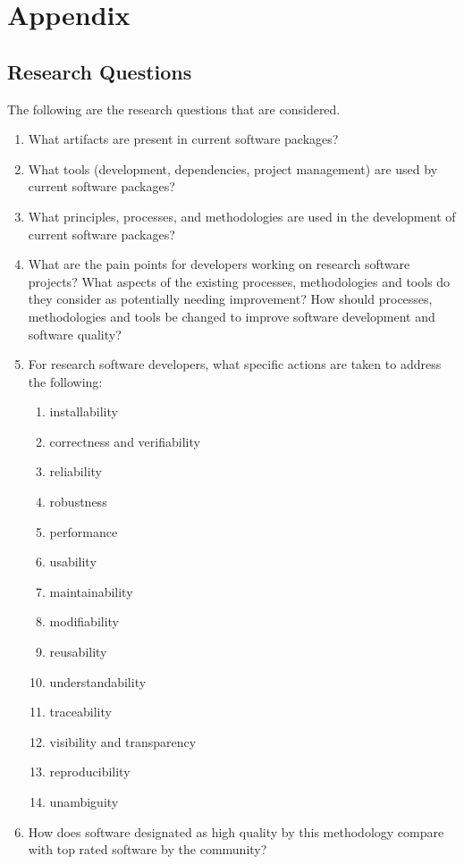 \documentclass[12pt, notitlepage]{article}
\begin{document}
\section{Appendix}
\begin{singlespace}
	
\subsection{Research Questions}\label{researchquestions}
	The following are the research questions that are considered. 
	
	\begin{enumerate}
		\item What artifacts are present in current software packages? 
		\item What tools (development, dependencies, project management) are used by current software packages?
		\item What principles, processes, and methodologies are used in the development
		of current software packages?
		\item What are the pain points for developers working on research software
		projects?  What aspects of the existing processes, methodologies and tools do
		they consider as potentially needing improvement?  How should processes,
		methodologies and tools be changed to improve software development and
		software quality?
		\item For research software developers, what specific actions are taken to
		address the following:
		\begin{enumerate}
			\item installability
			\item correctness and verifiability
			\item reliability
			\item robustness
			\item performance
			\item usability
			\item maintainability
			\item modifiability
			\item reusability
			\item understandability
			\item traceability
			\item visibility and transparency
			\item reproducibility
			\item unambiguity
		\end{enumerate} 
		\item How does software designated as high quality by this methodology compare	with top rated software by the community?
	\end{enumerate}


\end{singlespace}
\end{document}
